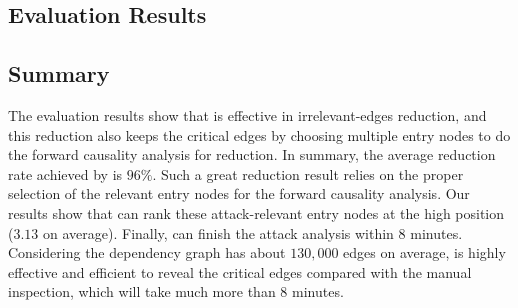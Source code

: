 










\subsection{Evaluation Results}
\label{subsec:eval-results}









%

\subsection{Summary}
The evaluation results show that \tool is effective in irrelevant-edges reduction, and this reduction also keeps the critical edges by choosing multiple entry nodes to do the forward causality analysis for reduction. 
In summary, the average reduction rate achieved by \tool is $96\%$. 
Such a great reduction result relies on the proper selection of the relevant entry nodes for the forward causality analysis. 
Our results show that \tool can rank these attack-relevant entry nodes at the high position ($3.13$ on average). 
Finally, \tool can finish the attack analysis within $8$ minutes.
Considering the dependency graph has about $130,000$ edges on average, \tool is highly effective and efficient to reveal the critical edges compared with the manual inspection, which will take much more than $8$ minutes.




